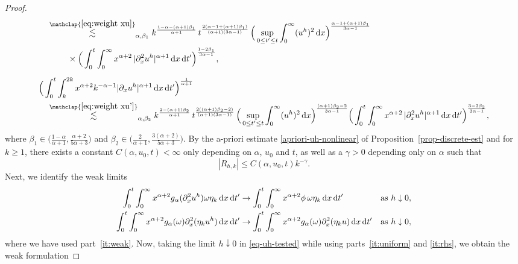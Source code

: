 \documentclass[reqno,12pt]{amsart}
\renewcommand{\d}{\ensuremath{\mathrm{d}}}
\renewcommand{\d}{\ensuremath{{\rm d}}}
\numberwithin{equation}{section}
\begin{document}
\begin{proof}
\begin{align*}
& \quad \stackrel{\mathclap{\eqref{eq:weight xu}}}{\lesssim}_{\alpha,\beta_1} k^{\frac{1-\alpha - (\alpha+1)\beta_1}{\alpha+1}} \, t^{\frac{2(\alpha -1 + (\alpha +1)\beta_1)}{(\alpha+1)(3\alpha -1)}}\, \Big( \sup_{0 \le t' \le t} \int_0^\infty (u^h)^2 \, \d x\Big)^{\frac{\alpha -1 + (\alpha +1)\beta_1}{3\alpha -1}} \\
& \quad \phantom{\lesssim_{\alpha,\beta_1}} \times \Big(\int_0^t \int_0^\infty x^{\alpha+2} \, |\partial_x^2 u^h|^{\alpha+1} \, \d x \, \d t'\Big)^{\frac{1-2\beta_1}{3\alpha -1}}, \\[0.2cm]
& \Big(\int_0^t \int_k^{2k} x^{\alpha+2} k^{-\alpha-1} |\partial_x u^h|^{\alpha+1} \, \d x \, \d t'\Big)^{\frac{1}{\alpha+1}} \\
& \quad \stackrel{\mathclap{\eqref{eq:weight xu'}}}{\lesssim}_{\alpha,\beta_2} k^{\frac{2-(\alpha+1)\beta_2}{\alpha+1}} \, t^{\frac{2((\alpha+1)\beta_2-2)}{(\alpha+1)(3\alpha-1)}}\, \Big( \sup_{0 \le t' \le t} \int_0^\infty (u^h)^2 \, \d x\Big)^{\frac{(\alpha +1)\beta_2 -2}{3\alpha -1}} \Big(\int_0^t \int_0^\infty x^{\alpha+2} \, |\partial_x^2 u^h|^{\alpha+1} \, \d x \, \d t'\Big)^{\frac{3-2\beta_2}{3\alpha -1}},
\end{align*}
%
where \(\beta_1 \in \big(\frac{1-\alpha}{\alpha +1}, \frac{\alpha+2}{5\alpha +3}\big)\) and \(\beta_2 \in \big(\frac{2}{\alpha +1}, \frac{3(\alpha+2)}{5\alpha +3}\big)\). By the a-priori estimate \eqref{apriori-uh-nonlinear} of Proposition~\ref{prop-discrete-est} and for $k \ge 1$, there exists a constant $C(\alpha,u_0,t) < \infty$ only depending on $\alpha$, $u_0$ and $t$, as well as a $\gamma > 0$ depending only on $\alpha$ such that
%
\begin{equation}\label{est-remainder-minty}
|R_{h,k}| \le C(\alpha,u_0,t) k^{-\gamma}.
\end{equation}
%
Next, we identify the weak limits
%
\begin{align*}
\int_0^t \int_0^\infty x^{\alpha+2} g_\alpha(\partial_x^2 u^h) \omega \eta_k \, \d x \, \d t' &\to \int_0^t \int_0^\infty x^{\alpha+2} \phi \, \omega \eta_k \, \d x \, \d t' && \text{as } h \downarrow 0, \\
\int_0^t \int_0^\infty x^{\alpha+2} g_\alpha(\omega) \partial_x^2 (\eta_k u^h) \, \d x \, \d t' &\to \int_0^t \int_0^\infty x^{\alpha+2} g_\alpha(\omega) \partial_x^2 (\eta_k u) \, \d x \, \d t' && \text{as } h \downarrow 0,
\end{align*}
%
where we have used part~\eqref{it:weak}. Now, taking the limit $h \downarrow 0$ in \eqref{eq-uh-tested} while using parts~\eqref{it:uniform} and \eqref{it:rhs}, we obtain the weak formulation

\end{proof}
\end{document}
